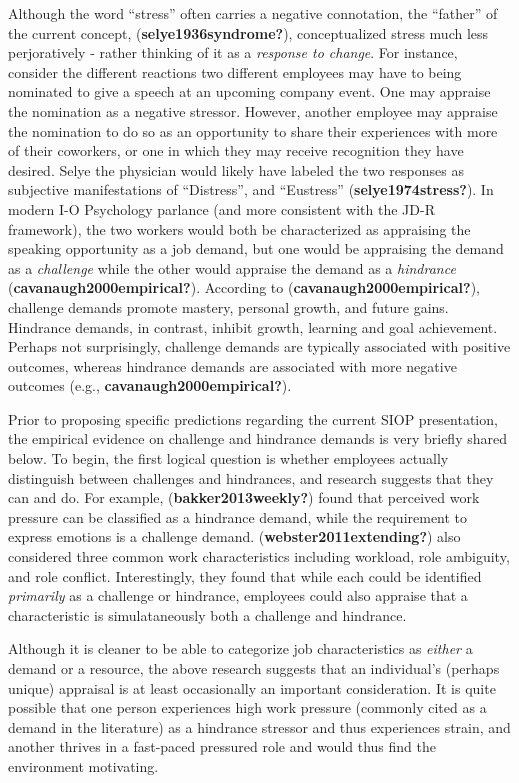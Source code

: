 \documentclass[
  man]{apa6}
\begin{document}
Although the word ``stress'' often carries a negative connotation, the ``father'' of the current concept, (\textbf{selye1936syndrome?}), conceptualized stress much less perjoratively - rather thinking of it as a \emph{response to change}. For instance, consider the different reactions two different employees may have to being nominated to give a speech at an upcoming company event. One may appraise the nomination as a negative stressor. However, another employee may appraise the nomination to do so as an opportunity to share their experiences with more of their coworkers, or one in which they may receive recognition they have desired. Selye the physician would likely have labeled the two responses as subjective manifestations of ``Distress'', and ``Eustress'' (\textbf{selye1974stress?}). In modern I-O Psychology parlance (and more consistent with the JD-R framework), the two workers would both be characterized as appraising the speaking opportunity as a job demand, but one would be appraising the demand as a \emph{challenge} while the other would appraise the demand as a \emph{hindrance} (\textbf{cavanaugh2000empirical?}). According to (\textbf{cavanaugh2000empirical?}), challenge demands promote mastery, personal growth, and future gains. Hindrance demands, in contrast, inhibit growth, learning and goal achievement. Perhaps not surprisingly, challenge demands are typically associated with positive outcomes, whereas hindrance demands are associated with more negative outcomes (e.g., \textbf{cavanaugh2000empirical?}).

Prior to proposing specific predictions regarding the current SIOP presentation, the empirical evidence on challenge and hindrance demands is very briefly shared below. To begin, the first logical question is whether employees actually distinguish between challenges and hindrances, and research suggests that they can and do. For example, (\textbf{bakker2013weekly?}) found that perceived work pressure can be classified as a hindrance demand, while the requirement to express emotions is a challenge demand. (\textbf{webster2011extending?}) also considered three common work characteristics including workload, role ambiguity, and role conflict. Interestingly, they found that while each could be identified \emph{primarily} as a challenge or hindrance, employees could also appraise that a characteristic is simulataneously both a challenge and hindrance.

Although it is cleaner to be able to categorize job characteristics as \emph{either} a demand or a resource, the above research suggests that an individual's (perhaps unique) appraisal is at least occasionally an important consideration. It is quite possible that one person experiences high work pressure (commonly cited as a demand in the literature) as a hindrance stressor and thus experiences strain, and another thrives in a fast-paced pressured role and would thus find the environment motivating.
\end{document}
